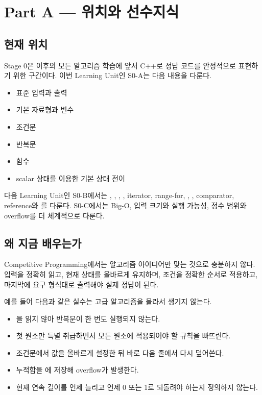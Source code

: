 \section{Part A --- 위치와 선수지식}

\subsection{현재 위치}
Stage 0은 이후의 모든 알고리즘 학습에 앞서 C++로 정답 코드를 안정적으로 표현하기 위한 구간이다. 이번 Learning Unit인 S0-A는 다음 내용을 다룬다.
\begin{itemize}
  \item 표준 입력과 출력
  \item 기본 자료형과 변수
  \item 조건문
  \item 반복문
  \item 함수
  \item scalar 상태를 이용한 기본 상태 전이
\end{itemize}

다음 Learning Unit인 S0-B에서는 , , , , iterator, range-for, , , comparator, reference와 를 다룬다. S0-C에서는 Big-O, 입력 크기와 실행 가능성, 정수 범위와 overflow를 더 체계적으로 다룬다.

\subsection{왜 지금 배우는가}
Competitive Programming에서는 알고리즘 아이디어만 맞는 것으로 충분하지 않다. 입력을 정확히 읽고, 현재 상태를 올바르게 유지하며, 조건을 정확한 순서로 적용하고, 마지막에 요구 형식대로 출력해야 실제 정답이 된다.

예를 들어 다음과 같은 실수는 고급 알고리즘을 몰라서 생기지 않는다.
\begin{itemize}
  \item {}을 읽지 않아 반복문이 한 번도 실행되지 않는다.
  \item 첫 원소만 특별 취급하면서 모든 원소에 적용되어야 할 규칙을 빠뜨린다.
  \item 조건문에서 값을 올바르게 설정한 뒤 바로 다음 줄에서 다시 덮어쓴다.
  \item 누적합을 에 저장해 overflow가 발생한다.
  \item 현재 연속 길이를 언제 늘리고 언제 0 또는 1로 되돌려야 하는지 정의하지 않는다.
\end{itemize}

